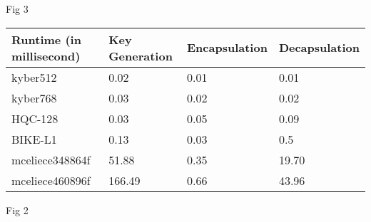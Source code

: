 \documentclass{article}
\begin{document}
Fig 3\newline
\begin{table}[]
\begin{tabular}{|l|l|l|l|}
\hline
Runtime (in millisecond) & Key Generation & Encapsulation & Decapsulation \\ \hline
kyber512                 & 0.02           & 0.01          & 0.01          \\ \hline
kyber768                 & 0.03           & 0.02          & 0.02          \\ \hline
HQC-128                  & 0.03           & 0.05          & 0.09          \\ \hline
BIKE-L1                  & 0.13           & 0.03          & 0.5           \\ \hline
mceliece348864f          & 51.88          & 0.35          & 19.70         \\ \hline
mceliece460896f          & 166.49         & 0.66          & 43.96         \\ \hline
\end{tabular}
\end{table}
Fig 2 \newline
\end{document}
